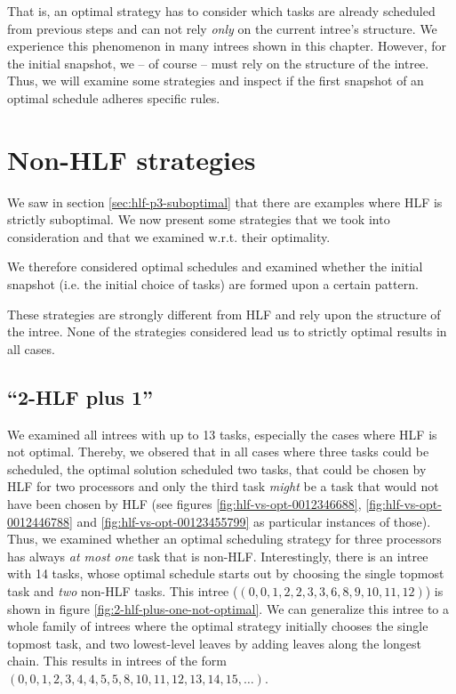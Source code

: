 That is, an optimal strategy has to consider which tasks are already scheduled from previous steps and can not rely \emph{only} on the current intree's structure. We experience this phenomenon in many intrees shown in this chapter. However, for the initial snapshot, we -- of course -- must rely on the structure of the intree. Thus, we will examine some strategies and inspect if the first snapshot of an optimal schedule adheres specific rules.

\section{Non-HLF strategies}
\label{sec:suboptimal-non-hlf-strategies}

We saw in section \ref{sec:hlf-p3-suboptimal} that there are examples where HLF is strictly suboptimal. We now present some strategies that we took into consideration and that we examined w.r.t. their optimality. 

We therefore considered optimal schedules and examined whether the initial snapshot (i.e. the initial choice of tasks) are formed upon a certain pattern.

These strategies are strongly different from HLF and rely upon the structure of the intree. None of the strategies considered lead us to strictly optimal results in all cases.

\subsection{``2-HLF plus 1''}
\label{sec:disproving-2hlf-plus-1}

We examined all intrees with up to 13 tasks, especially the cases where HLF is not optimal. Thereby, we obsered that in all cases where three tasks could be scheduled, the optimal solution scheduled two tasks, that could be chosen by HLF for two processors and only the third task \emph{might} be a task that would not have been chosen by HLF (see figures \ref{fig:hlf-vs-opt-0012346688}, \ref{fig:hlf-vs-opt-0012446788} and \ref{fig:hlf-vs-opt-00123455799} as particular instances of those). Thus, we examined whether an optimal scheduling strategy for three processors has always \emph{at most one} task that is non-HLF. Interestingly, there is an intree with 14 tasks, whose optimal schedule starts out by choosing the single topmost task and \emph{two} non-HLF tasks. This intree ($(0,0,1,2,2,3,3,6,8,9,10,11,12)$) is shown in figure \ref{fig:2-hlf-plus-one-not-optimal}. We can generalize this intree to a whole family of intrees where the optimal strategy initially chooses the single topmost task, and two lowest-level leaves by adding leaves along the longest chain. This results in intrees of the form $(0, 0, 1, 2, 3, 4, 4, 5, 5, 8, 10, 11, 12, 13, 14, 15,\dots)$.

